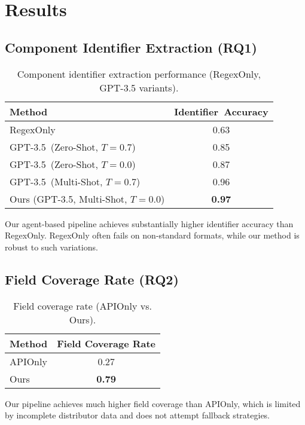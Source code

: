 \section{Results}
\subsection{Component Identifier Extraction (RQ1)}
\begin{table}[H]
\centering
\caption{Component identifier extraction performance (RegexOnly, GPT-3.5 variants).}
\label{tab:mpn}
\begin{tabular}{lc}
\toprule
Method & Identifier~Accuracy \\
\midrule
RegexOnly                        & 0.63 \\
GPT-3.5~(Zero-Shot, $T=0.7$)     & 0.85 \\
GPT-3.5~(Zero-Shot, $T=0.0$)     & 0.87 \\
GPT-3.5~(Multi-Shot, $T=0.7$)    & 0.96 \\
Ours (GPT-3.5, Multi-Shot, $T=0.0$)       & \textbf{0.97} \\
\bottomrule
\end{tabular}
\end{table}
Our agent-based pipeline achieves substantially higher identifier accuracy than RegexOnly. RegexOnly often fails on non-standard formats, while our method is robust to such variations.

\subsection{Field Coverage Rate (RQ2)}
\begin{table}[H]
\centering
\caption{Field coverage rate (APIOnly vs. Ours).}
\label{tab:coverage}
\begin{tabular}{lc}
\toprule
Method & Field Coverage Rate \\
\midrule
APIOnly   & 0.27 \\
Ours      & \textbf{0.79} \\
\bottomrule
\end{tabular}
\end{table}
Our pipeline achieves much higher field coverage than APIOnly, which is limited by incomplete distributor data and does not attempt fallback strategies.

